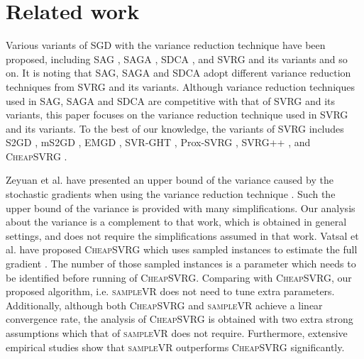 \documentclass[letterpaper]{article}
\begin{document}
 

\section{Related work}
\label{sect_related_work}
Various variants of  SGD with the variance reduction technique have been proposed, including SAG \cite{Schmidt:2013ui}, SAGA \cite{Defazio:2014vu}, SDCA \cite{ShalevShwartz:2015vw}, and SVRG \cite{Johnson:9MAvkbgy} and its variants and so on. It is noting that SAG, SAGA and SDCA adopt different variance reduction techniques from SVRG and its variants. Although variance reduction techniques used in SAG, SAGA and SDCA are competitive with that of SVRG and its variants,  this paper focuses on the variance reduction technique used in SVRG and its variants. To the best of our knowledge,  the variants of SVRG includes S2GD \cite{Richtarik:2013te}, mS2GD \cite{Liu:2015bx}, EMGD \cite{Zhang2013Linear}, SVR-GHT \cite{Li:2016vh}, Prox-SVRG \cite{Xiao:2014vw}, SVRG++ \cite{Allen2015Improved}, and \textsc{CheapSVRG} \cite{Shah2016Trading}. 

Zeyuan et al. have presented an upper bound of the variance caused by the stochastic gradients when using the variance reduction technique \cite{AllenZhu:2016up}. Such the upper bound of the variance is provided with  many simplifications. Our analysis about the variance is a complement to that work, which is obtained in general settings, and does not require the simplifications assumed in that work. Vatsal et al. have proposed \textsc{CheapSVRG} which uses sampled instances to estimate the full gradient \cite{Shah2016Trading}. The number of those sampled instances is a parameter which needs to be identified before running of \textsc{CheapSVRG}. Comparing with \textsc{CheapSVRG}, our proposed algorithm, i.e. \textsc{sampleVR} does not need to tune extra parameters. Additionally, although both \textsc{CheapSVRG} and \textsc{sampleVR} achieve a linear convergence rate, the analysis of \textsc{CheapSVRG} is obtained with two extra strong assumptions which that of \textsc{sampleVR} does not require. Furthermore, extensive empirical studies show that  \textsc{sampleVR} outperforms \textsc{CheapSVRG} significantly.
 
\end{document}
